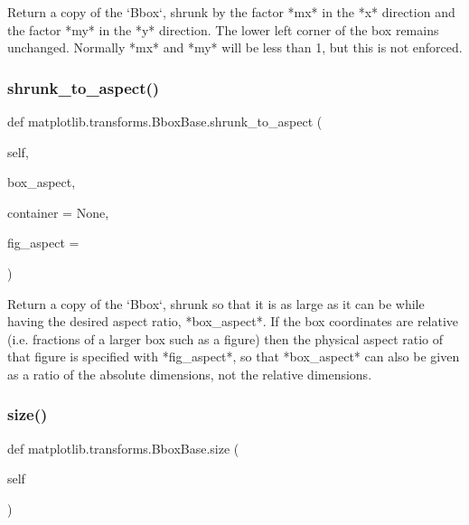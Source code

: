 \begin{DoxyVerb}Return a copy of the `Bbox`, shrunk by the factor *mx*
in the *x* direction and the factor *my* in the *y* direction.
The lower left corner of the box remains unchanged.  Normally
*mx* and *my* will be less than 1, but this is not enforced.
\end{DoxyVerb}
 \mbox{\label{classmatplotlib_1_1transforms_1_1BboxBase_aacaf20b9c121d0e05fa1b26fc6ab91a2}} 
\subsubsection{\texorpdfstring{shrunk\+\_\+to\+\_\+aspect()}{shrunk\_to\_aspect()}}
{\footnotesize\ttfamily def matplotlib.\+transforms.\+Bbox\+Base.\+shrunk\+\_\+to\+\_\+aspect (\begin{DoxyParamCaption}\item[{}]{self,  }\item[{}]{box\+\_\+aspect,  }\item[{}]{container = {\ttfamily None},  }\item[{}]{fig\+\_\+aspect = {} }\end{DoxyParamCaption})}

\begin{DoxyVerb}Return a copy of the `Bbox`, shrunk so that it is as
large as it can be while having the desired aspect ratio,
*box_aspect*.  If the box coordinates are relative (i.e.
fractions of a larger box such as a figure) then the
physical aspect ratio of that figure is specified with
*fig_aspect*, so that *box_aspect* can also be given as a
ratio of the absolute dimensions, not the relative dimensions.
\end{DoxyVerb}
 \mbox{\label{classmatplotlib_1_1transforms_1_1BboxBase_ac259d06a033400fdd58b8ba87522a796}} 
\subsubsection{\texorpdfstring{size()}{size()}}
{\footnotesize\ttfamily def matplotlib.\+transforms.\+Bbox\+Base.\+size (\begin{DoxyParamCaption}\item[{}]{self }\end{DoxyParamCaption})}

